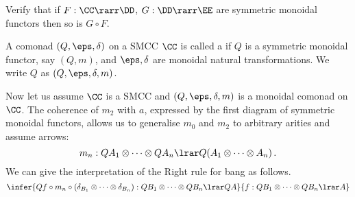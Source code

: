 \documentclass[12pt]{article}
\begin{document}
\begin{myexercise}
Verify that if $F:\CC\rarr\DD$, $G:\DD\rarr\EE$ are symmetric monoidal functors then so is $G\circ F$.
\end{myexercise}
\begin{mydefinition}
A comonad $(Q,\eps,\delta)$ on a SMCC $\CC$ is called a  if $Q$ is a symmetric monoidal functor, say $(Q,m)$, and
$\eps,\delta$ are monoidal natural transformations. We write $Q$ as $(Q,\eps,\delta,m)$. \deq
\end{mydefinition}
%
Now let us assume $\CC$ is a SMCC and $(Q,\eps,\delta,m)$ is a monoidal comonad on $\CC$. The coherence of $m_2$ with $a$, expressed by the first
diagram of symmetric monoidal functors, allows us to generalise $m_0$ and $m_2$ to arbitrary arities and assume arrows:
\[ m_n: QA_1\otimes\cdots\otimes QA_n\lrar Q(A_1\otimes\cdots\otimes A_n)\,. \]
We can give the interpretation of the Right rule for bang as follows.
\[
\infer{Qf\circ m_n\circ(\delta_{B_1}\otimes\cdots\otimes\delta_{B_n}):QB_1\otimes\cdots\otimes QB_n\lrar QA}{f:QB_1\otimes\cdots\otimes QB_n\lrar A}
\]
\end{document}

